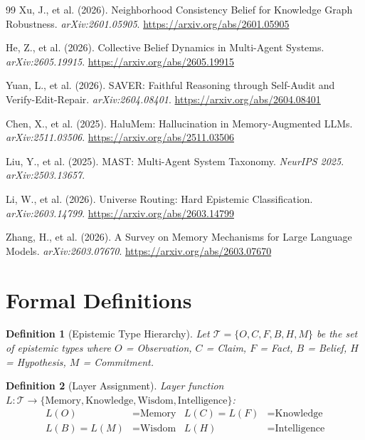 \documentclass[11pt,a4paper]{article}
\newtheorem{definition}{Definition}[section]
\begin{document}
\begin{thebibliography}{99}
Xu, J., et al. (2026).
\newblock Neighborhood Consistency Belief for Knowledge Graph Robustness.
\newblock \textit{arXiv:2601.05905}. \url{https://arxiv.org/abs/2601.05905}

He, Z., et al. (2026).
\newblock Collective Belief Dynamics in Multi-Agent Systems.
\newblock \textit{arXiv:2605.19915}. \url{https://arxiv.org/abs/2605.19915}

Yuan, L., et al. (2026).
\newblock SAVER: Faithful Reasoning through Self-Audit and Verify-Edit-Repair.
\newblock \textit{arXiv:2604.08401}. \url{https://arxiv.org/abs/2604.08401}

Chen, X., et al. (2025).
\newblock HaluMem: Hallucination in Memory-Augmented LLMs.
\newblock \textit{arXiv:2511.03506}. \url{https://arxiv.org/abs/2511.03506}

Liu, Y., et al. (2025).
\newblock MAST: Multi-Agent System Taxonomy.
\newblock \textit{NeurIPS 2025}. \textit{arXiv:2503.13657}.

Li, W., et al. (2026).
\newblock Universe Routing: Hard Epistemic Classification.
\newblock \textit{arXiv:2603.14799}. \url{https://arxiv.org/abs/2603.14799}

Zhang, H., et al. (2026).
\newblock A Survey on Memory Mechanisms for Large Language Models.
\newblock \textit{arXiv:2603.07670}. \url{https://arxiv.org/abs/2603.07670}

\end{thebibliography}

\appendix
\section{Formal Definitions}
\label{app:formal}

\begin{definition}[Epistemic Type Hierarchy]
\label{def:types}
Let $\mathcal{T} = \{O, C, F, B, H, M\}$ be the set of epistemic types where $O$ = Observation, $C$ = Claim, $F$ = Fact, $B$ = Belief, $H$ = Hypothesis, $M$ = Commitment.
\end{definition}

\begin{definition}[Layer Assignment]
\label{def:layers}
Layer function $L: \mathcal{T} \to \{\text{Memory}, \text{Knowledge}, \text{Wisdom}, \text{Intelligence}\}$:
\begin{align*}
L(O) &= \text{Memory} & L(C) = L(F) &= \text{Knowledge} \\
L(B) = L(M) &= \text{Wisdom} & L(H) &= \text{Intelligence}
\end{align*}
\end{definition}
\end{document}
